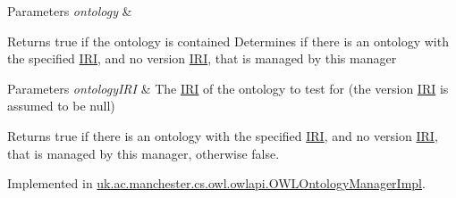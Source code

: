 \begin{DoxyParams}{Parameters}
{\em ontology} & \\
\hline
\end{DoxyParams}
\begin{DoxyReturn}{Returns}
true if the ontology is contained Determines if there is an ontology with the specified \hyperlink{classorg_1_1semanticweb_1_1owlapi_1_1model_1_1_i_r_i}{I\-R\-I}, and no version \hyperlink{classorg_1_1semanticweb_1_1owlapi_1_1model_1_1_i_r_i}{I\-R\-I}, that is managed by this manager 
\end{DoxyReturn}

\begin{DoxyParams}{Parameters}
{\em ontology\-I\-R\-I} & The \hyperlink{classorg_1_1semanticweb_1_1owlapi_1_1model_1_1_i_r_i}{I\-R\-I} of the ontology to test for (the version \hyperlink{classorg_1_1semanticweb_1_1owlapi_1_1model_1_1_i_r_i}{I\-R\-I} is assumed to be {\ttfamily null}) \\
\hline
\end{DoxyParams}
\begin{DoxyReturn}{Returns}
{\ttfamily true} if there is an ontology with the specified \hyperlink{classorg_1_1semanticweb_1_1owlapi_1_1model_1_1_i_r_i}{I\-R\-I}, and no version \hyperlink{classorg_1_1semanticweb_1_1owlapi_1_1model_1_1_i_r_i}{I\-R\-I}, that is managed by this manager, otherwise {\ttfamily false}. 
\end{DoxyReturn}


Implemented in \hyperlink{classuk_1_1ac_1_1manchester_1_1cs_1_1owl_1_1owlapi_1_1_o_w_l_ontology_manager_impl_a803a1de8cb544f4585133121727319d6}{uk.\-ac.\-manchester.\-cs.\-owl.\-owlapi.\-O\-W\-L\-Ontology\-Manager\-Impl}.

